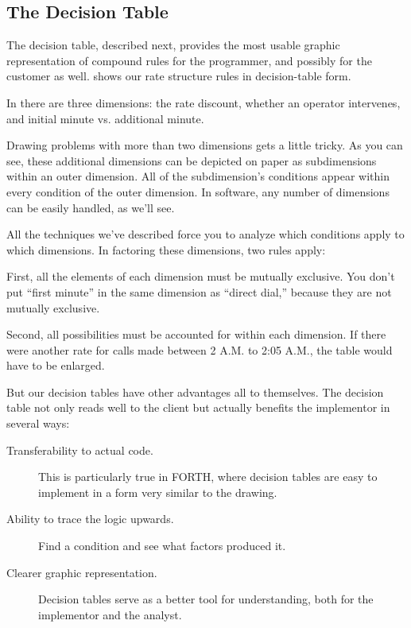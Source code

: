

\subsection{The Decision Table}

The decision table, described next, provides the most usable graphic
representation of compound rules for the programmer, and possibly for
the customer as well.  shows our rate structure rules in
decision-table form.


In  there are three dimensions: the rate discount, whether
an operator intervenes, and initial minute vs. additional minute.

Drawing problems with more than two dimensions gets a little tricky.
As you can see, these additional dimensions can be depicted on
paper as subdimensions within an outer dimension. All of the
subdimension's conditions appear within every condition of the outer
dimension.  In software, any number of dimensions can be easily
handled, as we'll see.

All the techniques we've described force you to analyze which
conditions apply to which dimensions. In factoring these dimensions,
two rules apply:

First, all the elements of each dimension must be mutually exclusive.
You don't put ``first minute'' in the same dimension as ``direct
dial,'' because they are not mutually exclusive.

Second, all possibilities must be accounted for within each dimension.
If there were another rate for calls made between 2 A.M. to 2:05 A.M.,
the table would have to be enlarged.

But our decision tables have other advantages all to themselves.  The
decision table not only reads well to the client but actually benefits
the implementor in several ways:

\begin{description}
\item[Transferability to actual code.] This is particularly true in FORTH,
where decision tables are easy to implement in a form very similar to the
drawing.

\item[Ability to trace the logic upwards.] Find a condition and see what
factors produced it.

\item[Clearer graphic representation.] Decision tables serve as a better tool
for understanding, both for the implementor and the analyst.
\end{description}

